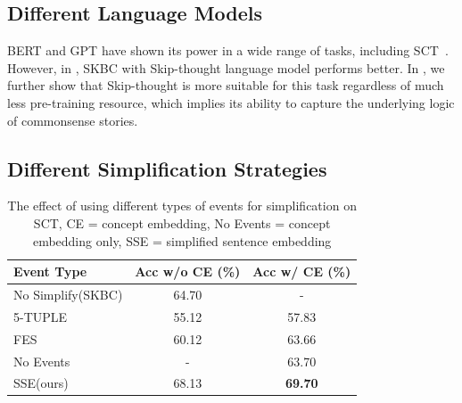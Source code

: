 \subsection{Different Language Models}
\label{sec:lm}
\begin{table}[th!]
\small
\centering
{}
\caption{The effect of using difference languauge models on
raw story sentences.}
\label{tab:lm}
\end{table}

BERT and GPT have shown its power in a wide range of tasks, 
including SCT~\cite{radford2018improving,chen2018incorporating}. 
However, in , 
SKBC with Skip-thought language model performs better. 
In , we further show that Skip-thought is 
more suitable for this task regardless of much less pre-training 
resource, which implies its ability to capture the underlying logic 
of commonsense stories.

 
\subsection{Different Simplification Strategies}
\label{sec:simplify}

\begin{table}[th!]
\small
\centering
\begin{tabular}{lcc}
\hline
\textbf{Event Type} & Acc w/o CE (\%) & Acc w/ CE (\%)\\
\hline \hline
No Simplify(SKBC)& 64.70 & - \\
\hline
5-TUPLE&55.12 &57.83\\
FES&60.12 &63.66\\
No Events & - & 63.70 \\
SSE(ours)& 68.13 &{\bf 69.70} \\
\hline
\end{tabular}
\caption{The effect of using different types of events for simplification
on SCT, CE = concept embedding, 
No Events = concept embedding only, SSE = simplified sentence embedding}
\label{tab:sse}
\end{table}

